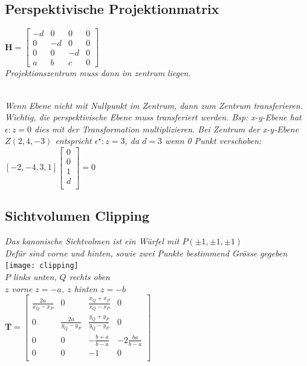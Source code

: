 \subsection{Perspektivische Projektionmatrix}

$\mathbf{H} = \begin{bmatrix}
    -d & 0 & 0 & 0 \\
    0 & -d & 0 & 0 \\
    0 & 0 & -d & 0 \\
    a & b & c & 0
\end{bmatrix}$ \\

\textit{Projektionszentrum muss dann im zentrum liegen.}

\textit{\\
    Wenn Ebene nicht mit Nullpunkt im Zentrum, dann zum Zentrum transferieren.
    Wichtig, die perspektivische Ebene muss transferiert werden. Bsp: x-y-Ebene hat $\epsilon: z = 0$
    dies mit der Transformation multiplizieren. Bei Zentrum der x-y-Ebene $Z(2,4,-3)$ entspricht
    $\epsilon^\star: z = 3$, da $d = 3$ wenn 0 Punkt verschoben:
}
$[-2, -4, 3, 1] \begin{bmatrix}
    0 \\ 0 \\ 1 \\ d \\
\end{bmatrix} = 0$

\subsection{Sichtvolumen Clipping}

\textit{Das kanonische Sichtvolmen ist ein Würfel mit $P(\pm 1, \pm 1, \pm 1)$} \\
\textit{Defür sind vorne und hinten, sowie zwei Punkte bestimmend Grösse gegeben} \\

\texttt{[image: clipping]} \\

\textit{$P$ links unten, $Q$ rechts oben} \\
\textit{$z$ vorne $z=-a$, $z$ hinten $z=-b$} \\

$\mathbf{T} = \begin{bmatrix}
    \frac{2a}{x_Q - x_P} & 0 & \frac{x_Q + x_P}{x_Q - x_P} & 0 \\
    0 & \frac{2a}{y_Q - y_P} & \frac{y_Q + y_P}{y_Q - y_P} & 0 \\
    0 & 0 & -\frac{b+a}{b-a} & -2\frac{ba}{b-a} \\
    0 & 0 & -1 & 0 \\
\end{bmatrix}$